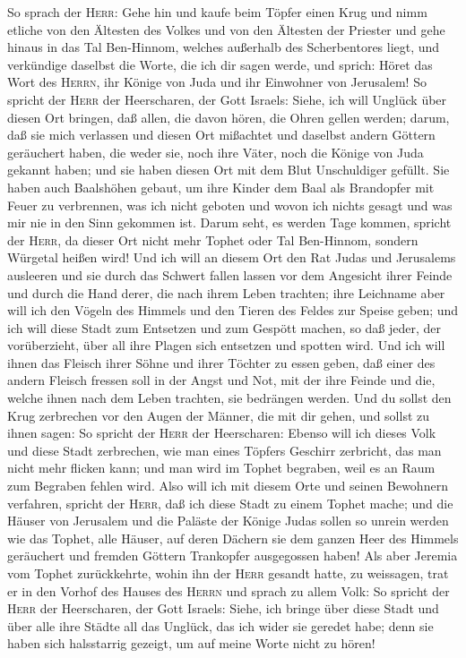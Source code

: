  So sprach der \textsc{Herr}: Gehe hin und kaufe beim
Töpfer einen Krug und nimm etliche von den Ältesten des Volkes und von
den Ältesten der Priester  und gehe hinaus in das Tal
Ben-Hinnom, welches außerhalb des Scherbentores liegt, und verkündige
daselbst die Worte, die ich dir sagen werde, und sprich: 
Höret das Wort des \textsc{Herrn}, ihr Könige von Juda und ihr Einwohner
von Jerusalem! So spricht der \textsc{Herr} der Heerscharen, der Gott
Israels: Siehe, ich will Unglück über diesen Ort bringen, daß allen, die
davon hören, die Ohren gellen werden;  darum, daß sie mich
verlassen und diesen Ort mißachtet und daselbst andern Göttern
geräuchert haben, die weder sie, noch ihre Väter, noch die Könige von
Juda gekannt haben; und sie haben diesen Ort mit dem Blut Unschuldiger
gefüllt.  Sie haben auch Baalshöhen gebaut, um ihre Kinder
dem Baal als Brandopfer mit Feuer zu verbrennen, was ich nicht geboten
und wovon ich nichts gesagt und was mir nie in den Sinn gekommen ist.
 Darum seht, es werden Tage kommen, spricht der
\textsc{Herr}, da dieser Ort nicht mehr Tophet oder Tal Ben-Hinnom,
sondern Würgetal heißen wird!  Und ich will an diesem Ort
den Rat Judas und Jerusalems ausleeren und sie durch das Schwert fallen
lassen vor dem Angesicht ihrer Feinde und durch die Hand derer, die nach
ihrem Leben trachten; ihre Leichname aber will ich den Vögeln des
Himmels und den Tieren des Feldes zur Speise geben;  und
ich will diese Stadt zum Entsetzen und zum Gespött machen, so daß jeder,
der vorüberzieht, über all ihre Plagen sich entsetzen und spotten wird.
 Und ich will ihnen das Fleisch ihrer Söhne und ihrer
Töchter zu essen geben, daß einer des andern Fleisch fressen soll in der
Angst und Not, mit der ihre Feinde und die, welche ihnen nach dem Leben
trachten, sie bedrängen werden.  Und du sollst den Krug
zerbrechen vor den Augen der Männer, die mit dir gehen, 
und sollst zu ihnen sagen: So spricht der \textsc{Herr} der Heerscharen:
Ebenso will ich dieses Volk und diese Stadt zerbrechen, wie man eines
Töpfers Geschirr zerbricht, das man nicht mehr flicken kann; und man
wird im Tophet begraben, weil es an Raum zum Begraben fehlen wird.
 Also will ich mit diesem Orte und seinen Bewohnern
verfahren, spricht der \textsc{Herr}, daß ich diese Stadt zu einem
Tophet mache;  und die Häuser von Jerusalem und die
Paläste der Könige Judas sollen so unrein werden wie das Tophet, alle
Häuser, auf deren Dächern sie dem ganzen Heer des Himmels geräuchert und
fremden Göttern Trankopfer ausgegossen haben!  Als aber
Jeremia vom Tophet zurückkehrte, wohin ihn der \textsc{Herr} gesandt
hatte, zu weissagen, trat er in den Vorhof des Hauses des \textsc{Herrn}
und sprach zu allem Volk:  So spricht der \textsc{Herr}
der Heerscharen, der Gott Israels: Siehe, ich bringe über diese Stadt
und über alle ihre Städte all das Unglück, das ich wider sie geredet
habe; denn sie haben sich halsstarrig gezeigt, um auf meine Worte nicht
zu hören!

